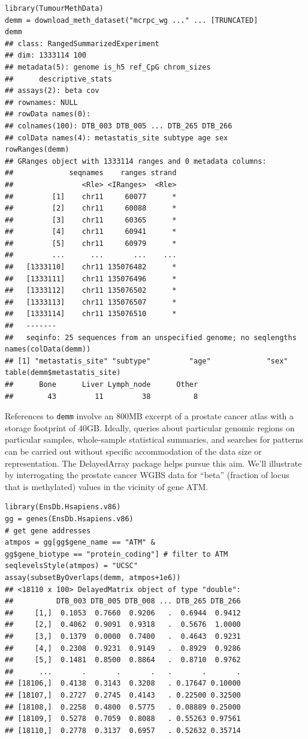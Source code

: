 \documentclass[graybox]{svmult}
\begin{document}
\begin{shaded}
\begin{verbatim}
library(TumourMethData)
demm = download_meth_dataset("mcrpc_wg ..." ... [TRUNCATED] 
demm
## class: RangedSummarizedExperiment 
## dim: 1333114 100 
## metadata(5): genome is_h5 ref_CpG chrom_sizes 
##      descriptive_stats
## assays(2): beta cov
## rownames: NULL
## rowData names(0):
## colnames(100): DTB_003 DTB_005 ... DTB_265 DTB_266
## colData names(4): metastatis_site subtype age sex
rowRanges(demm)
## GRanges object with 1333114 ranges and 0 metadata columns:
##             seqnames    ranges strand
##                <Rle> <IRanges>  <Rle>
##         [1]    chr11     60077      *
##         [2]    chr11     60088      *
##         [3]    chr11     60365      *
##         [4]    chr11     60941      *
##         [5]    chr11     60979      *
##         ...      ...       ...    ...
##   [1333110]    chr11 135076482      *
##   [1333111]    chr11 135076496      *
##   [1333112]    chr11 135076502      *
##   [1333113]    chr11 135076507      *
##   [1333114]    chr11 135076510      *
##   -------
##   seqinfo: 25 sequences from an unspecified genome; no seqlengths
names(colData(demm))
## [1] "metastatis_site" "subtype"         "age"             "sex"            
table(demm$metastatis_site)
##      Bone      Liver Lymph_node      Other 
##        43         11         38          8 
\end{verbatim}
\end{shaded}


References to \texttt{demm} involve an 800MB excerpt of a
prostate cancer atlas with a
storage footprint of 40GB.
Ideally,
queries about particular genomic
regions on particular samples, whole-sample statistical summaries,
and searches for patterns can be carried out without
specific accommodation of the data size or representation.
The DelayedArray package helps pursue this aim. We'll illustrate
by interrogating the prostate cancer WGBS data for ``beta''
(fraction of locus that is methylated) values in the vicinity of
gene ATM.

\begin{shaded}
\begin{verbatim}
library(EnsDb.Hsapiens.v86)
gg = genes(EnsDb.Hsapiens.v86)
# get gene addresses
atmpos = gg[gg$gene_name == "ATM" &
gg$gene_biotype == "protein_coding"] # filter to ATM
seqlevelsStyle(atmpos) = "UCSC"
assay(subsetByOverlaps(demm, atmpos+1e6))
## <18110 x 100> DelayedMatrix object of type "double":
##          DTB_003 DTB_005 DTB_008 ... DTB_265 DTB_266
##     [1,]  0.1053  0.7660  0.9206   .  0.6944  0.9412
##     [2,]  0.4062  0.9091  0.9318   .  0.5676  1.0000
##     [3,]  0.1379  0.0000  0.7400   .  0.4643  0.9231
##     [4,]  0.2308  0.9231  0.9149   .  0.8929  0.9286
##     [5,]  0.1481  0.8500  0.8864   .  0.8710  0.9762
##      ...       .       .       .   .       .       .
## [18106,]  0.4138  0.3143  0.3208   . 0.17647 0.10000
## [18107,]  0.2727  0.2745  0.4143   . 0.22500 0.32500
## [18108,]  0.2258  0.4800  0.5775   . 0.08889 0.25000
## [18109,]  0.5278  0.7059  0.8088   . 0.55263 0.97561
## [18110,]  0.2778  0.3137  0.6957   . 0.52632 0.35714
\end{verbatim}
\end{shaded}
\end{document}
